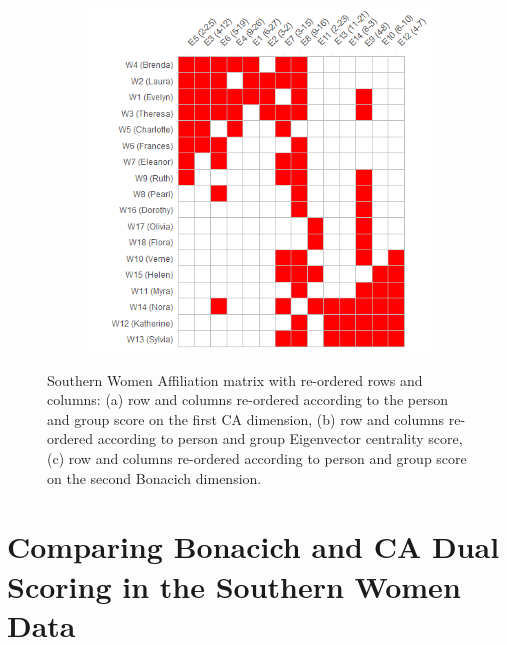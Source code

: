 \documentclass[a4paper,fleqn]{cas-sc}
\begin{document}
\begin{figure}[ht!]
\begin{subfigure}[b]{0.45\textwidth}
            \caption{}
            \label{fig:bon-reord1}
    \end{subfigure}
     \begin{subfigure}[b]{0.45\textwidth}
        \includegraphics[width=1.0\textwidth]{Plots/bon-reord2.png}
            \caption{}
            \label{fig:bon-reord2}
    \end{subfigure}
    \caption{Southern Women Affiliation matrix with re-ordered rows and columns: (a) row and columns re-ordered according to the person and group score on the first CA dimension, (b) row and columns re-ordered according to person and group Eigenvector centrality score, (c) row and columns re-ordered according to person and group score on the second Bonacich dimension.}
    \label{fig:ca-v-bon}
\end{figure}

\section{Comparing Bonacich and CA Dual Scoring in the Southern Women Data} \label{sec:comparing}
\end{document}
